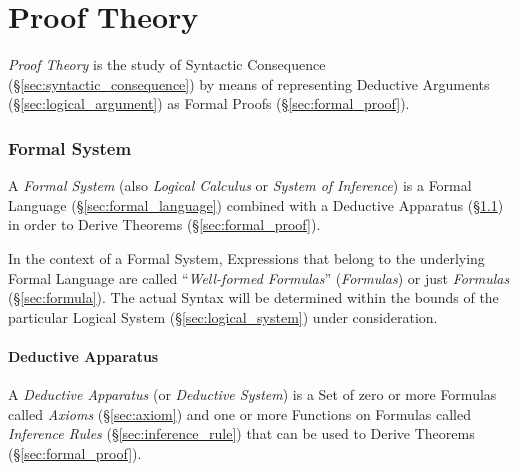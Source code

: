 \part{Proof Theory}\label{sec:proof_theory}

\emph{Proof Theory} is the study of Syntactic Consequence
(\S\ref{sec:syntactic_consequence}) by means of representing Deductive
Arguments (\S\ref{sec:logical_argument}) as Formal Proofs
(\S\ref{sec:formal_proof}).



\section{Formal System}\label{sec:formal_system}

A \emph{Formal System} (also \emph{Logical Calculus} or \emph{System
  of Inference}) is a Formal Language (\S\ref{sec:formal_language})
combined with a Deductive Apparatus (\S\ref{sec:deductive_apparatus})
in order to Derive Theorems (\S\ref{sec:formal_proof}).

In the context of a Formal System, Expressions that belong to the
underlying Formal Language are called ``\emph{Well-formed Formulas}''
(\emph{Formulas}) or just \emph{Formulas} (\S\ref{sec:formula}). The
actual Syntax will be determined within the bounds of the particular
Logical System (\S\ref{sec:logical_system}) under consideration.



\subsection{Deductive Apparatus}\label{sec:deductive_apparatus}

A \emph{Deductive Apparatus} (or \emph{Deductive System}) is a Set of
zero or more Formulas called \emph{Axioms} (\S\ref{sec:axiom}) and one or
more Functions on Formulas called \emph{Inference Rules}
(\S\ref{sec:inference_rule}) that can be used to Derive Theorems
(\S\ref{sec:formal_proof}).


